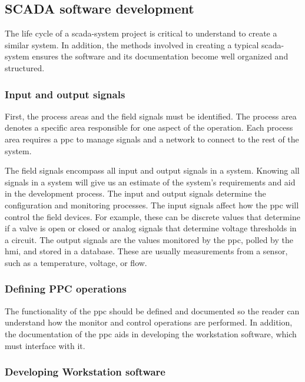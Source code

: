\documentclass[main.tex]{subfiles}
\begin{document}
\subsection{SCADA software development}

The life cycle of a \gls{scada}-system project is critical to understand to create a similar system. In addition, the methods involved in creating a typical \gls{scada}-system ensures the software and its documentation become well organized and structured.


\subsubsection{Input and output signals}

 First, the process areas and the field signals must be identified. The process area denotes a specific area responsible for one aspect of the operation. Each process area requires a \gls{ppc} to manage signals and a network to connect to the rest of the system.

The field signals encompass all input and output signals in a system. Knowing all signals in a system will give us an estimate of the system's requirements and aid in the development process. The input and output signals determine the configuration and monitoring processes. The input signals affect how the \gls{ppc} will control the field devices. For example, these can be discrete values that determine if a valve is open or closed or analog signals that determine voltage thresholds in a circuit. The output signals are the values monitored by the \gls{ppc}, polled by the \gls{hmi}, and stored in a database. These are usually measurements from a sensor, such as a temperature, voltage, or flow.


\subsubsection{Defining PPC operations}

The functionality of the \gls{ppc} should be defined and documented so the reader can understand how the monitor and control operations are performed. In addition, the documentation of the \gls{ppc} aids in developing the workstation software, which must interface with it.

\subsubsection{Developing Workstation software}
\end{document}
